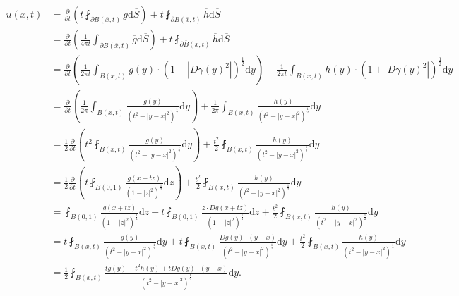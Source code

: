 $$
\begin{aligned}
u\left( x,t \right) &=\frac{\partial}{\partial t}\left( t\fint_{\partial \overline{B}\left( \overline{x},t \right)}{\overline{g}\mathrm{d}\overline{S}} \right) +t\fint_{\partial \overline{B}\left( \overline{x},t \right)}{\overline{h}\mathrm{d}\overline{S}}
\\
&=\frac{\partial}{\partial t}\left( \frac{1}{4\pi t}\int_{\partial \overline{B}\left( \overline{x},t \right)}{\overline{g}\mathrm{d}\overline{S}} \right) +t\fint_{\partial \overline{B}\left( \overline{x},t \right)}{\overline{h}\mathrm{d}\overline{S}}
\\
&=\frac{\partial}{\partial t}\left( \frac{1}{2\pi t}\int_{B\left( x,t \right)}{g\left( y \right) \cdot \left( 1+\left| D\gamma \left( y \right) ^2 \right| \right) ^{\frac{1}{2}}\mathrm{d}y} \right) +\frac{1}{2\pi t}\int_{B\left( x,t \right)}{h\left( y \right) \cdot \left( 1+\left| D\gamma \left( y \right) ^2 \right| \right) ^{\frac{1}{2}}\mathrm{d}y}
\\
&=\frac{\partial}{\partial t}\left( \frac{1}{2\pi}\int_{B\left( x,t \right)}{\frac{g\left( y \right)}{\left( t^2-\left| y-x \right|^2 \right) ^{\frac{1}{2}}}\mathrm{d}y} \right) +\frac{1}{2\pi}\int_{B\left( x,t \right)}{\frac{h\left( y \right)}{\left( t^2-\left| y-x \right|^2 \right) ^{\frac{1}{2}}}\mathrm{d}y}
\\
&=\frac{1}{2}\frac{\partial}{\partial t}\left( t^2\fint_{B\left( x,t \right)}{\frac{g\left( y \right)}{\left( t^2-\left| y-x \right|^2 \right) ^{\frac{1}{2}}}\mathrm{d}y} \right) +\frac{t^2}{2}\fint_{B\left( x,t \right)}{\frac{h\left( y \right)}{\left( t^2-\left| y-x \right|^2 \right) ^{\frac{1}{2}}}\mathrm{d}y}
\\
&=\frac{1}{2}\frac{\partial}{\partial t}\left( t\fint_{B\left( 0,1 \right)}{\frac{g\left( x+tz \right)}{\left( 1-\left| z \right|^2 \right) ^{\frac{1}{2}}}\mathrm{d}z} \right) +\frac{t^2}{2}\fint_{B\left( x,t \right)}{\frac{h\left( y \right)}{\left( t^2-\left| y-x \right|^2 \right) ^{\frac{1}{2}}}\mathrm{d}y}
\\
&=\fint_{B\left( 0,1 \right)}{\frac{g\left( x+tz \right)}{\left( 1-\left| z \right|^2 \right) ^{\frac{1}{2}}}\mathrm{d}z}+t\fint_{B\left( 0,1 \right)}{\frac{z\cdot Dg\left( x+tz \right)}{\left( 1-\left| z \right|^2 \right) ^{\frac{1}{2}}}\mathrm{d}z}+\frac{t^2}{2}\fint_{B\left( x,t \right)}{\frac{h\left( y \right)}{\left( t^2-\left| y-x \right|^2 \right) ^{\frac{1}{2}}}\mathrm{d}y}
\\
&=t\fint_{B\left( x,t \right)}{\frac{g\left( y \right)}{\left( t^2-\left| y-x \right|^2 \right) ^{\frac{1}{2}}}\mathrm{d}y}+t\fint_{B\left( x,t \right)}{\frac{Dg\left( y \right) \cdot \left( y-x \right)}{\left( t^2-\left| y-x \right|^2 \right) ^{\frac{1}{2}}}\mathrm{d}y}+\frac{t^2}{2}\fint_{B\left( x,t \right)}{\frac{h\left( y \right)}{\left( t^2-\left| y-x \right|^2 \right) ^{\frac{1}{2}}}\mathrm{d}y}
\\
&=\frac{1}{2}\fint_{B\left( x,t \right)}{\frac{tg\left( y \right) +t^2h\left( y \right) +tDg\left( y \right) \cdot \left( y-x \right)}{\left( t^2-\left| y-x \right|^2 \right) ^{\frac{1}{2}}}\mathrm{d}y}.
\end{aligned}
$$
